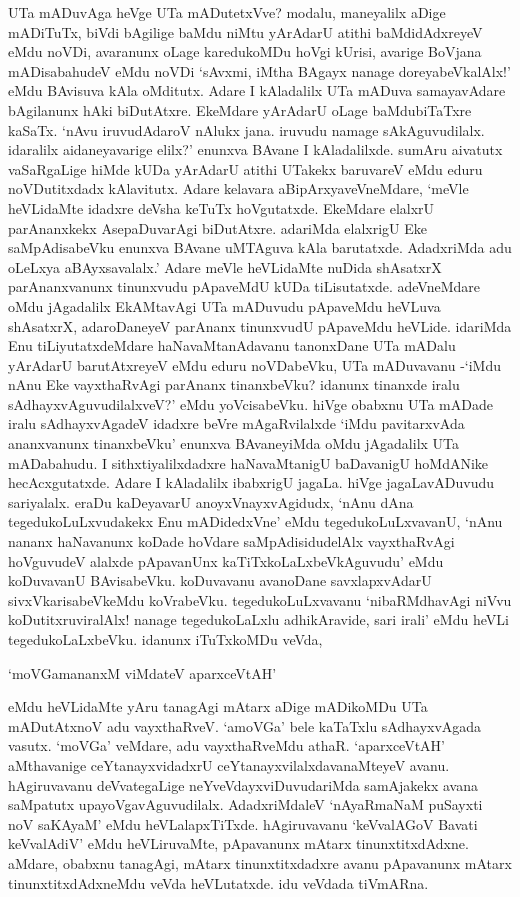 UTa mADuvAga heVge UTa mADutetxVve? modalu, maneyalilx aDige mADiTuTx, biVdi bAgilige baMdu niMtu yArAdarU atithi baMdidAdxreyeV eMdu noVDi, avaranunx oLage karedukoMDu hoVgi kUrisi, avarige BoVjana mADisabahudeV eMdu noVDi `sAvxmi, iMtha BAgayx nanage doreyabeVkalAlx!' eMdu BAvisuva kAla oMditutx. Adare I kAladalilx UTa mADuva samayavAdare bAgilanunx hAki biDutAtxre. EkeMdare yArAdarU oLage baMdubiTaTxre kaSaTx. `nAvu iruvudAdaroV nAlukx jana. iruvudu namage sAkAguvudilalx. idaralilx aidaneyavarige elilx?' enunxva BAvane I kAladalilxde. sumAru aivatutx vaSaRgaLige hiMde kUDa yArAdarU atithi UTakekx baruvareV eMdu eduru noVDutitxdadx kAlavitutx. Adare kelavara aBipArxyaveVneMdare, `meVle heVLidaMte idadxre deVsha keTuTx hoVgutatxde. EkeMdare elalxrU parAnanxkekx AsepaDuvarAgi biDutAtxre. adariMda elalxrigU Eke saMpAdisabeVku enunxva BAvane uMTAguva kAla barutatxde. AdadxriMda adu oLeLxya aBAyxsavalalx.' Adare meVle heVLidaMte nuDida shAsatxrX parAnanxvanunx tinunxvudu pApaveMdU kUDa tiLisutatxde. adeVneMdare oMdu jAgadalilx EkAMtavAgi UTa mADuvudu pApaveMdu heVLuva shAsatxrX, adaroDaneyeV parAnanx tinunxvudU pApaveMdu heVLide. idariMda Enu tiLiyutatxdeMdare haNavaMtanAdavanu tanonxDane UTa mADalu yArAdarU barutAtxreyeV eMdu eduru noVDabeVku, UTa mADuvavanu -`iMdu nAnu Eke vayxthaRvAgi parAnanx tinanxbeVku? idanunx tinanxde iralu sAdhayxvAguvudilalxveV?' eMdu yoVcisabeVku. hiVge obabxnu UTa mADade iralu sAdhayxvAgadeV idadxre beVre mAgaRvilalxde `iMdu pavitarxvAda ananxvanunx tinanxbeVku' enunxva BAvaneyiMda oMdu jAgadalilx UTa mADabahudu. I sithxtiyalilxdadxre haNavaMtanigU baDavanigU hoMdANike hecAcxgutatxde. Adare I kAladalilx ibabxrigU jagaLa. hiVge jagaLavADuvudu sariyalalx. eraDu kaDeyavarU anoyxVnayxvAgidudx, `nAnu dAna tegedukoLuLxvudakekx Enu mADidedxVne' eMdu tegedukoLuLxvavanU, `nAnu nananx haNavanunx koDade hoVdare saMpAdisidudelAlx vayxthaRvAgi hoVguvudeV alalxde pApavanUnx kaTiTxkoLaLxbeVkAguvudu' eMdu koDuvavanU BAvisabeVku. koDuvavanu avanoDane savxlapxvAdarU sivxVkarisabeVkeMdu koVrabeVku. tegedukoLuLxvavanu `nibaRMdhavAgi niVvu koDutitxruviralAlx! nanage tegedukoLaLxlu adhikAravide, sari irali' eMdu heVLi tegedukoLaLxbeVku. idanunx iTuTxkoMDu veVda,

\begin{shloka}
`moVGamananxM viMdateV aparxceVtAH'
\end{shloka}

\noindent eMdu heVLidaMte yAru tanagAgi mAtarx aDige mADikoMDu UTa mADutAtxnoV adu vayxthaRveV. `amoVGa' bele kaTaTxlu sAdhayxvAgada vasutx. `moVGa' veMdare, adu vayxthaRveMdu athaR. `aparxceVtAH' aMthavanige ceYtanayxvidadxrU ceYtanayxvilalxdavanaMteyeV avanu. hAgiruvavanu deVvategaLige neYveVdayxviDuvudariMda samAjakekx avana saMpatutx upayoVgavAguvudilalx. AdadxriMdaleV `nAyaRmaNaM puSayxti noV saKAyaM' eMdu heVLalapxTiTxde. hAgiruvavanu `keVvalAGoV Bavati keVvalAdiV' eMdu heVLiruvaMte, pApavanunx mAtarx tinunxtitxdAdxne. aMdare, obabxnu tanagAgi, mAtarx tinunxtitxdadxre avanu pApavanunx mAtarx tinunxtitxdAdxneMdu veVda heVLutatxde. idu veVdada tiVmARna.

